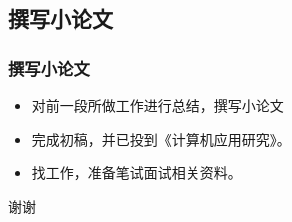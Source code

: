 \documentclass{beamer}
\begin{document}
\begin{CJK*}{UTF8}{}
\section{撰写小论文}
\begin{frame}
  \frametitle{撰写小论文}
  \begin{itemize}
    \item 对前一段所做工作进行总结，撰写小论文 
    \item 完成初稿，并已投到《计算机应用研究》。 
    \item 找工作，准备笔试面试相关资料。
  \end{itemize}
\end{frame}
\begin{frame}
 \begin{center}
  \LARGE 谢谢 
 \end{center}
\end{frame}
\end{CJK*}
\end{document}
